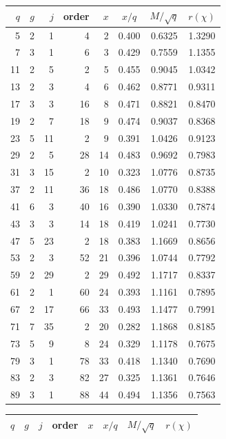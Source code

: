 \documentclass[11pt,a4paper,reqno]{amsart}
\theoremstyle{remark}
\numberwithin{equation}{section}
\begin{document}
\begin{table}[ht]
\centering\scriptsize
\setlength{\tabcolsep}{2.6pt}
\begin{tabular}{@{}rrrrrccc@{}}
\toprule
$q$ & $g$ & $j$ & order & $x$ & $x/q$ & $M/\sqrt q$ & $r(\chi)$\\
\midrule

5 & 2 & 1 & 4 & 2 & 0.400 & 0.6325 & 1.3290\\
7 & 3 & 1 & 6 & 3 & 0.429 & 0.7559 & 1.1355\\
11 & 2 & 5 & 2 & 5 & 0.455 & 0.9045 & 1.0342\\
13 & 2 & 3 & 4 & 6 & 0.462 & 0.8771 & 0.9311\\
17 & 3 & 3 & 16 & 8 & 0.471 & 0.8821 & 0.8470\\
19 & 2 & 7 & 18 & 9 & 0.474 & 0.9037 & 0.8368\\
23 & 5 & 11 & 2 & 9 & 0.391 & 1.0426 & 0.9123\\
29 & 2 & 5 & 28 & 14 & 0.483 & 0.9692 & 0.7983\\
31 & 3 & 15 & 2 & 10 & 0.323 & 1.0776 & 0.8735\\
37 & 2 & 11 & 36 & 18 & 0.486 & 1.0770 & 0.8388\\
41 & 6 & 3 & 40 & 16 & 0.390 & 1.0330 & 0.7874\\
43 & 3 & 3 & 14 & 18 & 0.419 & 1.0241 & 0.7730\\
47 & 5 & 23 & 2 & 18 & 0.383 & 1.1669 & 0.8656\\
53 & 2 & 3 & 52 & 21 & 0.396 & 1.0744 & 0.7792\\
59 & 2 & 29 & 2 & 29 & 0.492 & 1.1717 & 0.8337\\
61 & 2 & 1 & 60 & 24 & 0.393 & 1.1161 & 0.7895\\
67 & 2 & 17 & 66 & 33 & 0.493 & 1.1477 & 0.7991\\
71 & 7 & 35 & 2 & 20 & 0.282 & 1.1868 & 0.8185\\
73 & 5 & 9 & 8 & 24 & 0.329 & 1.1178 & 0.7675\\
79 & 3 & 1 & 78 & 33 & 0.418 & 1.1340 & 0.7690\\
83 & 2 & 3 & 82 & 27 & 0.325 & 1.1361 & 0.7646\\
89 & 3 & 1 & 88 & 44 & 0.494 & 1.1356 & 0.7563\\
\bottomrule
\end{tabular}
\hspace{0.8em}
\begin{tabular}{@{}rrrrrccc@{}}
\toprule
$q$ & $g$ & $j$ & order & $x$ & $x/q$ & $M/\sqrt q$ & $r(\chi)$\\
\midrule


\end{tabular}
\end{table}
\end{document}
